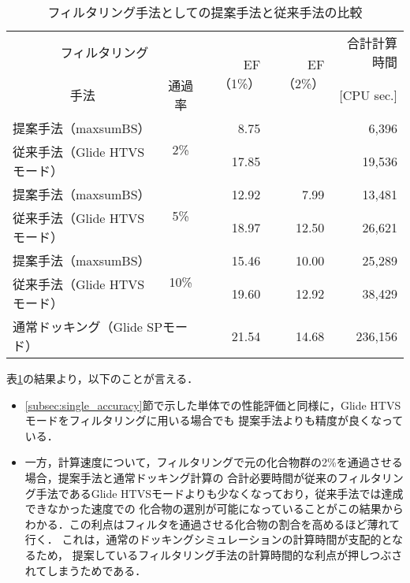 \begin{table}[htb] \centering
	\caption{フィルタリング手法としての提案手法と従来手法の比較}
	\label{table:filtering_proposal_Glide}
	\begin{tabular}{lc|rr|r}
	\hline
	\multicolumn{2}{c|}{フィルタリング}					&\multirow{2}{*}{EF（1\%）}	&\multirow{2}{*}{EF（2\%）}	&合計計算時間	\\
	\multicolumn{1}{c}{手法}		&通過率				&						&						&[CPU sec.]		\\ \hline
	提案手法（maxsumBS）		&\multirow{2}{*}{2\%}	&8.75					&\textendash				&6,396			\\
	従来手法（Glide HTVSモード）	&					&17.85					&\textendash				&19,536			\\
	提案手法（maxsumBS）		&\multirow{2}{*}{5\%}	&12.92					&7.99					&13,481			\\
	従来手法（Glide HTVSモード）	&					&18.97					&12.50					&26,621			\\
	提案手法（maxsumBS）		&\multirow{2}{*}{10\%}	&15.46					&10.00					&25,289			\\
	従来手法（Glide HTVSモード）	&					&19.60					&12.92					&38,429			\\ \hline
	\multicolumn{2}{l|}{通常ドッキング（Glide SPモード）}	&21.54					&14.68					&236,156			\\ \hline
	\end{tabular}
\end{table}

表\ref{table:filtering_proposal_Glide}の結果より，以下のことが言える．
\begin{itemize}
\item \ref{subsec:single_accuracy}節で示した単体での性能評価と同様に，Glide HTVSモードをフィルタリングに用いる場合でも
	提案手法よりも精度が良くなっている．
\item 一方，計算速度について，フィルタリングで元の化合物群の2\%を通過させる場合，提案手法と通常ドッキング計算の
	合計必要時間が従来のフィルタリング手法であるGlide HTVSモードよりも少なくなっており，従来手法では達成できなかった速度での
	化合物の選別が可能になっていることがこの結果からわかる．この利点はフィルタを通過させる化合物の割合を高めるほど薄れて行く．
	これは，通常のドッキングシミュレーションの計算時間が支配的となるため，
	提案しているフィルタリング手法の計算時間的な利点が押しつぶされてしまうためである．
\end{itemize}